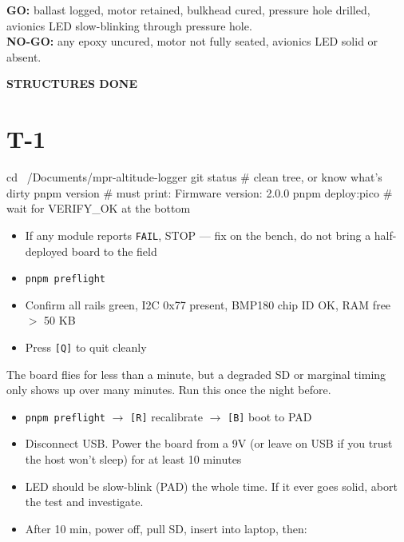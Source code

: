 \documentclass[11pt,a4paper,oneside]{report}
\newcommand{\done}[1]{\bigskip\begin{center}\sffamily\bfseries\Large\textcolor{rocketred}{#1}\end{center}\bigskip}
\begin{document}
\begin{gobox}
\textbf{GO:} ballast logged, motor retained, bulkhead cured, pressure hole drilled, avionics LED slow-blinking through pressure hole. \\[4pt]
\textbf{NO-GO:} any epoxy uncured, motor not fully seated, avionics LED solid or absent.
\end{gobox}

\done{STRUCTURES DONE}


\section{T-1}


\begin{codebox}
cd ~/Documents/mpr-altitude-logger
git status            # clean tree, or know what's dirty
pnpm version          # must print: Firmware version: 2.0.0
pnpm deploy:pico      # wait for VERIFY_OK at the bottom
\end{codebox}

\begin{itemize}
  \item If any module reports \texttt{FAIL}, STOP --- fix on the bench, do not bring a half-deployed board to the field
\end{itemize}

\begin{itemize}
  \item \texttt{pnpm preflight}
  \item Confirm all rails green, I2C 0x77 present, BMP180 chip ID OK, RAM free $>$ 50 KB
  \item Press \texttt{[Q]} to quit cleanly
\end{itemize}


The board flies for less than a minute, but a degraded SD or marginal timing only shows up over many minutes. Run this once the night before.

\begin{itemize}
  \item \texttt{pnpm preflight} $\to$ \texttt{[R]} recalibrate $\to$ \texttt{[B]} boot to PAD
  \item Disconnect USB. Power the board from a 9V (or leave on USB if you trust the host won't sleep) for at least 10 minutes
  \item LED should be slow-blink (PAD) the whole time. If it ever goes solid, abort the test and investigate.
  \item After 10 min, power off, pull SD, insert into laptop, then:
\end{itemize}
\end{document}
